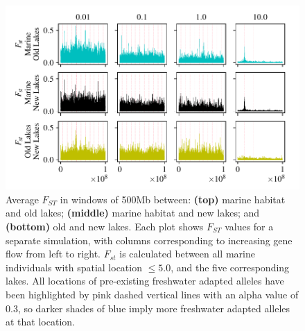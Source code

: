 \documentclass{article}
\begin{document}
\begin{figure}
    \begin{center}
          \includegraphics[width=1.0\linewidth]{Final_Plots/Fst_Genome_faa0_5_500.pdf}
          \caption{
        Average $F_{ST}$ in windows of 500Mb between:
                \textbf{(top)} marine habitat and old lakes;
                \textbf{(middle)} marine habitat and new lakes; and
                \textbf{(bottom)} old and new lakes.
                Each plot shows $F_{ST}$ values for a separate simulation,
                with columns corresponding to increasing gene flow from left to right.
        $F_{st}$ is calculated between all marine individuals with spatial location $\le 5.0$, and the five corresponding lakes.
        All locations of pre-existing freshwater adapted alleles have been highlighted by 
        pink dashed vertical lines with an alpha value of 0.3, so darker shades of blue imply more 
        freshwater adapted alleles at that location.
        }
          \label{fig:fst_5lakes}
    \end{center}
\end{figure}
\end{document}
